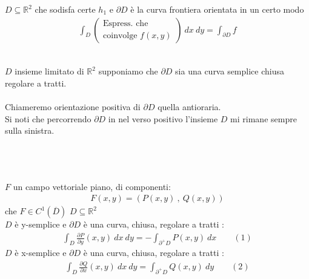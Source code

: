 \documentclass[a4paper, oneside]{article}
\def\potatoshape{
  (1,0) (2,1.5) (1.6,3) (0.3,2.7) (-0.4,1.2)
}
\newcommand{\potato}[3][draw=white]{
  \begin{scope}[shift={#2}, scale=#3]
    \draw[#1]
      plot [smooth cycle, tension=1]
      coordinates {\potatoshape};
  \end{scope}
}
\begin{document}
 $D \subseteq \mathbb{R}^2$ che sodisfa certe $h_1$ e $\partial D$ è la curva frontiera orientata in un certo modo\\
\begin{gather*}
  \int_D \begin{pmatrix}
    \text{Espress. che}\\
    \text{coinvolge } f(x,y)
  \end{pmatrix}
  \ dx \ dy = \int_{\partial D} f
\end{gather*}
\begin{figure}
\end{figure}
\hfil\\
$D$ insieme limitato di $\mathbb{R}^2$ supponiamo che $\partial D$ sia una curva semplice chiusa regolare a tratti.\\
\hfill\\
Chiameremo orientazione positiva di $\partial D$ quella antioraria.\\
Si noti che percorrendo $\partial D$ in nel verso positivo l'insieme $D$ mi rimane sempre sulla sinistra.\\
\hfill\\\hfil\\\hfil\\
\begin{lemma}
   $F$ un campo vettoriale piano, di componenti:
  \begin{gather*}
    F(x,y) = \left( P(x,y) \ , \ Q(x,y) \right)
  \end{gather*}
   che $F \in C^1 (\overline{D})$ 
   $D \subseteq \mathbb{R}^2$\\ 
   $D$ è y-semplice e $\partial D$ è una curva, chiusa, regolare a tratti :
  \begin{gather*}
    \int_D \frac{\partial P}{\partial y}(x,y) \ dx \ dy = -\int_{\partial^+ D} P(x,y) \ dx \qquad (1)
  \end{gather*}
   $D$ è x-semplice e $\partial D$ è una curva, chiusa, regolare a tratti :
  \begin{gather*}
    \int_D \frac{\partial Q}{\partial x}(x,y) \ dx \ dy = \int_{\partial^+ D} Q(x,y) \ dy \qquad (2)
  \end{gather*}
\end{lemma}
\end{document}

